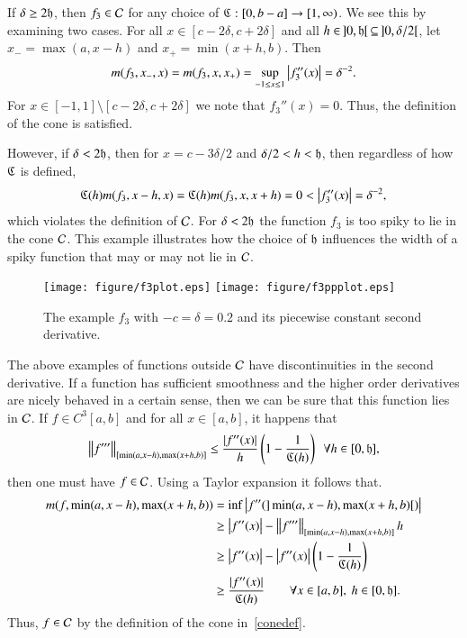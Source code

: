 \documentclass[review]{elsarticle}
\theoremstyle{definition}
\begin{document}
If $\delta \ge 2 \fh$, then $f_3 \in \cc$ for
any choice of $\fC : [0,b-a] \to [1,\infty)$.  We see this by examining two cases.  For all $x \in [c - 2 \delta, c + 2 \delta]$ and all $h \in \, ]0,\fh[ \, \subseteq \, ]0,\delta/2[$, let $x_- = \max(a, x -h)$ and $x_+ = \min(x +h,b)$.  Then
\[
m(f_3,x_-,x) = m(f_3,x,x_+) = \sup_{-1 \le x \le 1} \abs{f_3''(x)}  = \delta^{-2}.
\]
For $x \in [-1,1] \setminus [c - 2 \delta , c + 2 \delta]$ we note that $f_3''(x) = 0$. Thus, the definition of the cone is satisfied.

However, if $\delta < 2 \fh$, then for $x = c-3\delta/2$ and $\delta/2 < h < \fh$, then regardless of how $\fC$ is defined,
\[
\fC(h)m(f_3,x - h,x)=\fC(h)m(f_3,x,x+h)=0 < \abs{f''_3(x)} = \delta^{-2},
\]
which violates the definition of $\cc$.  For $\delta < 2 \fh$ the function $f_3$ is too spiky to lie in the cone $\cc$.   This example illustrates how the choice of $\fh$ influences the width of
a spiky function that may or may not lie in $\cc$.

\begin{figure}[t]
\centering
\texttt{[image: figure/f3plot.eps]} \quad
\texttt{[image: figure/f3ppplot.eps]}
\caption{The example $f_3$ with $-c=\delta = 0.2$  and its piecewise constant second derivative. \label{f3fig}}
\end{figure}

The above examples of functions outside $\cc$ have discontinuities in the second
derivative.  If a function has sufficient smoothness and the higher order derivatives are nicely behaved in a certain sense, then we can be sure that this function lies in $\cc$.   If  $f \in C^3[a,b]$ and for all $x \in [a,b]$, it happens that
\begin{equation} \label{conesuffconda}
\norm[{[\min(a,x-h),\max(x+h,b)]}]{f'''} \le \frac{\abs{f''(x)}}{h} \left( 1 - \frac{1}{\fC(h)} \right) \ \ \forall h \in [0,\fh],
\end{equation}
then one must have $f \in \cc$.  Using a Taylor expansion it follows that.
\begin{align*}
m(f,\min(a,x-h),\max(x+h,b)) & = \inf \abs{f''(]\min(a,x-h),\max(x+h,b)[)} \\
& \ge \abs{f''(x)}  - \norm[{[\min(a,x-h),\max(x+h,b)]}]{f'''}h \\
& \ge \abs{f''(x)}  - \abs{f''(x)}\left( 1 - \frac{1}{\fC(h)} \right) \\
& \ge \frac{\abs{f''(x)}}{\fC(h)} \qquad \forall x \in [a,b],\ h \in [0,\fh].
\end{align*}
Thus, $f \in \cc$ by the definition of the cone in~\eqref{conedef}.
\end{document}
